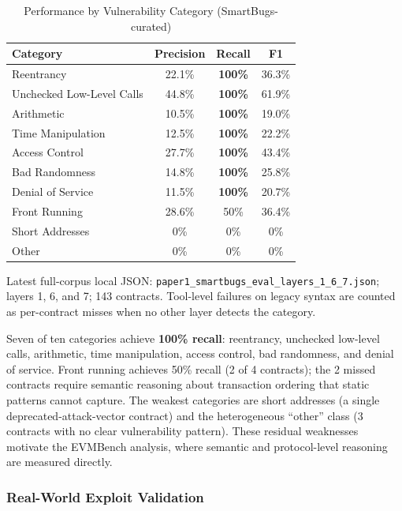 \documentclass[conference]{IEEEtran}
\begin{document}
\begin{table}[htbp]
\caption{Performance by Vulnerability Category (SmartBugs-curated)}
\label{tab:categories}
\centering
\begin{tabular}{@{}lccc@{}}
\toprule
\textbf{Category} & \textbf{Precision} & \textbf{Recall} & \textbf{F1} \\
\midrule
Reentrancy & 22.1\% & \textbf{100\%} & 36.3\% \\
Unchecked Low-Level Calls & 44.8\% & \textbf{100\%} & 61.9\% \\
Arithmetic & 10.5\% & \textbf{100\%} & 19.0\% \\
Time Manipulation & 12.5\% & \textbf{100\%} & 22.2\% \\
Access Control & 27.7\% & \textbf{100\%} & 43.4\% \\
Bad Randomness & 14.8\% & \textbf{100\%} & 25.8\% \\
Denial of Service & 11.5\% & \textbf{100\%} & 20.7\% \\
Front Running & 28.6\% & 50\% & 36.4\% \\
Short Addresses & 0\% & 0\% & 0\% \\
Other & 0\% & 0\% & 0\% \\
\bottomrule
\end{tabular}

\vspace{2pt}
\footnotesize{Latest full-corpus local JSON: \texttt{paper1\_smartbugs\_eval\_layers\_1\_6\_7.json}; layers 1, 6, and 7; 143 contracts. Tool-level failures on legacy syntax are counted as per-contract misses when no other layer detects the category.}
\end{table}

Seven of ten categories achieve \textbf{100\% recall}: reentrancy, unchecked low-level calls, arithmetic, time manipulation, access control, bad randomness, and denial of service. Front running achieves 50\% recall (2 of 4 contracts); the 2 missed contracts require semantic reasoning about transaction ordering that static patterns cannot capture. The weakest categories are short addresses (a single deprecated-attack-vector contract) and the heterogeneous ``other'' class (3 contracts with no clear vulnerability pattern). These residual weaknesses motivate the EVMBench analysis, where semantic and protocol-level reasoning are measured directly.

\subsubsection{Real-World Exploit Validation}
\end{document}

